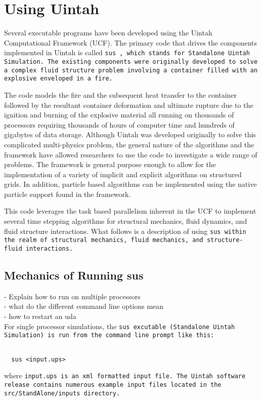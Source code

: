 \section{Using Uintah} \label{Sec:UCF}

Several executable programs have been developed using the Uintah
Computational Framework (UCF).  The primary code that drives the
components implemented in Uintah is called \tt sus \normalfont, which
stands for Standalone Uintah Simulation.  The existing components were
originally developed to solve a complex fluid structure problem
involving a container filled with an explosive enveloped in a fire.

The code models the fire and the subsequent heat transfer to the
container followed by the resultant container deformation and ultimate
rupture due to the ignition and burning of the explosive material all
running on thousands of processors requiring thousands of hours of
computer time and hundreds of gigabytes of data storage.  Although
Uintah was developed originally to solve this complicated
multi-physics problem, the general nature of the algorithms and the
framework have allowed researchers to use the code to investigate a
wide range of problems.  The framework is general purpose enough to
allow for the implementation of a variety of implicit and explicit
algorithms on structured grids.  In addition, particle based
algorithms can be implemented using the native particle support found
in the framework.

This code leverages the task based parallelism inherent in the UCF to
implement several time stepping algorithms for structural mechanics,
fluid dynamics, and fluid structure interactions.  What follows is a
description of using \tt sus \normalfont within the realm of
structural mechanics, fluid mechanics, and structure-fluid
interactions.


\subsection{Mechanics of Running sus}
 - Explain how to run on multiple processors\\
 - what do the different command line options mean\\
 - how to restart an uda\\

For single processor simulations, the \tt sus \normalfont excutable
(Standalone Uintah Simulation) is run from the command line prompt
like this:
\begin{Verbatim}[fontsize=\footnotesize]
  
  sus <input.ups>

\end{Verbatim}
where \tt input.ups \normalfont is an xml formatted input file.  The
Uintah software release contains numerous example input files located
in the src/StandAlone/inputs directory.

